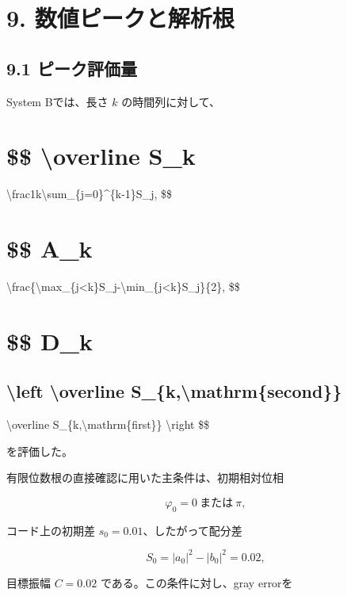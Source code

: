 \documentclass[
  a4paper,
  10pt]{article}
\begin{document}
\section{9.
数値ピークと解析根}\label{9-ux6570ux5024ux30d4ux30fcux30afux3068ux89e3ux6790ux6839}

\subsection{9.1
ピーク評価量}\label{91-ux30d4ux30fcux30afux8a55ux4fa1ux91cf}

System Bでは、長さ \(k\) の時間列に対して、

\section{\$\$ \textbackslash overline S\_k}\label{-overline-s_k}

\textbackslash frac1k\textbackslash sum\_\{j=0\}\^{}\{k-1\}S\_j, \$\$

\section{\$\$ A\_k}\label{-a_k}

\textbackslash frac\{\textbackslash max\_\{j\textless k\}S\_j-\textbackslash min\_\{j\textless k\}S\_j\}\{2\},
\$\$

\section{\$\$ D\_k}\label{-d_k}

\subsection{\textbackslash left\textbar{} \textbackslash overline
S\_\{k,\textbackslash mathrm\{second\}\}}\label{left-overline-s_kmathrmsecond}

\textbackslash overline S\_\{k,\textbackslash mathrm\{first\}\}
\textbackslash right\textbar{} \$\$

を評価した。

有限位数根の直接確認に用いた主条件は、初期相対位相

\[
\varphi_0=0\ \text{または}\ \pi,
\]

コード上の初期差 \(s_0=0.01\)、したがって配分差

\[
S_0=|a_0|^2-|b_0|^2=0.02,
\]

目標振幅 \(C=0.02\) である。この条件に対し、gray errorを
\end{document}

